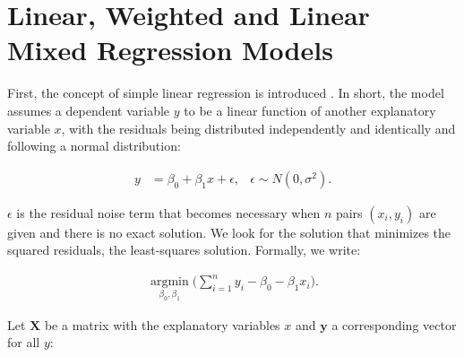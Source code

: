\documentclass[11pt,a4paper,twoside]{book}\usepackage[]{graphicx}\usepackage[]{color}
\begin{document}

\section{Linear, Weighted and Linear Mixed Regression Models} \label{sec:regression}
First, the concept of simple linear regression is introduced \citep{fahrmeir2007}. In short, the model assumes a dependent variable $y$ to be a linear function of another explanatory variable $x$, with the residuals being distributed independently and identically and following a normal distribution:

\begin{align}
y &= \beta_0 + \beta_1 x + \epsilon, & \epsilon \sim N(0, \sigma^2). \label{eq:simple.regression}
\end{align}

$\epsilon$ is the residual noise term that becomes necessary when $n$ pairs $(x_i, y_i)$ are given and there is no exact solution. We look for the solution that minimizes the squared residuals, the least-squares solution. Formally, we write:

\begin{align}
\operatorname*{argmin}_{\beta_0, \beta_1}\Big(\sum_{i = 1}^n y_i - \beta_0 - \beta_1 x_i\Big). \label{eq:least.squares}
\end{align}

Let $\mathbf{X}$ be a matrix with the explanatory variables $x$ and $\mathbf{y}$ a corresponding vector for all $y$:
\end{document}
